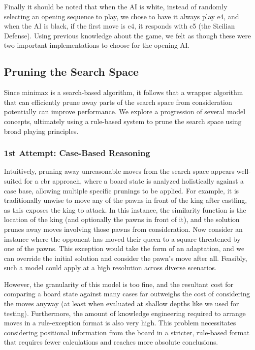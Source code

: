 \documentclass[letterpaper]{article}
\begin{document}
Finally it should be noted that when the AI is white, instead of randomly selecting an opening sequence to play, we chose to have it always play e4, and when the AI is black, if the first move is e4, it responds with c5 (the Sicilian Defense). Using previous knowledge about the game, we felt as though these were two important implementations to choose for the opening AI.

\subsection{Pruning the Search Space}
Since minimax is a search-based algorithm, it follows that a wrapper algorithm that can efficiently prune away parts of the search space from consideration potentially can improve performance.  We explore a progression of several model concepts, ultimately using a rule-based system to prune the search space using broad playing principles.

\subsubsection{1st Attempt: Case-Based Reasoning}
Intuitively, pruning away unreasonable moves from the search space appears well-suited for a \acrshort{cbr} approach, where a board state is analyzed holistically against a case base, allowing multiple specific prunings to be applied.  For example, it is traditionally unwise to move any of the pawns in front of the king after castling, as this exposes the king to attack.  In this instance, the similarity function is the location of the king (and optionally the pawns in front of it), and the solution prunes away moves involving those pawns from consideration.  Now consider an instance where the opponent has moved their queen to a square threatened by one of the pawns.  This exception would take the form of an adaptation, and we can override the initial solution and consider the pawn's move after all.  Feasibly, such a model could apply at a high resolution across diverse scenarios.

However, the granularity of this model is too fine, and the resultant cost for comparing a board state against many cases far outweighs the cost of considering the moves anyway (at least when evaluated at shallow depths like we used for testing).  Furthermore, the amount of knowledge engineering required to arrange moves in a rule-exception format is also very high.  This problem necessitates considering positional information from the board in a stricter, rule-based format that requires fewer calculations and reaches more absolute conclusions.
\end{document}
